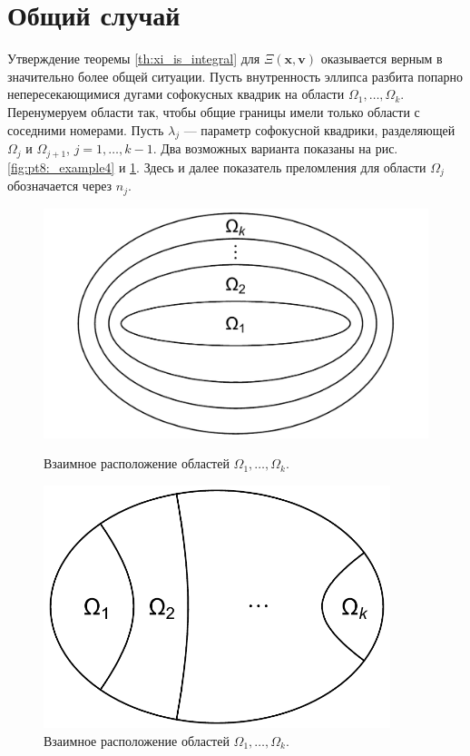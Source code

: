 \section{Общий случай}\label{sec:ch3/sec3}
Утверждение теоремы \ref{th:xi_is_integral} для $\Xi(\mathbf{x}, \mathbf{v})$ оказывается верным в значительно более общей ситуации.
Пусть внутренность эллипса разбита попарно непересекающимися дугами софокусных квадрик на области $\Omega_1, \ldots, \Omega_k$.  Перенумеруем области так, чтобы общие границы имели только области с соседними номерами. Пусть $\lambda_j$ --- параметр софокусной квадрики, разделяющей $\Omega_j$ и $\Omega_{j+1}$, $j=1, \ldots, k-1$. Два возможных варианта показаны на рис. \ref{fig:pt8:_example4} и \ref{fig:pt8:_example5}. Здесь и далее показатель преломления для области $\Omega_j$ обозначается через $n_j$.
\begin{figure}[!htb]
   \includegraphics[width=1\textwidth]{images/ch4/section1/multiple ellipses.pdf}
    \caption{Взаимное расположение областей $\Omega_1, \ldots, \Omega_k$.}
    \label{fig:pt8:_example4}
\endminipage\hfill
{}
    \includegraphics[width=0.9\textwidth]{images/ch4/section1/multiple hyperbolas.pdf}   
    \caption{Взаимное расположение областей $\Omega_1, \ldots, \Omega_k$.}
    \label{fig:pt8:_example5}
\endminipage\hfill
\end{figure}


